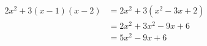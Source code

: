 \documentclass[border=2pt]{standalone}
\begin{document}
\begin{varwidth}{\linewidth}
\begin{align*}
2x^2 + 3(x-1)(x-2) &= 2x^2 + 3(x^2-3x+2)   \\
                   &= 2x^2 + 3x^2 - 9x + 6 \\
                   &= 5x^2 - 9x + 6
\end{align*}
\end{varwidth}
\end{document}
